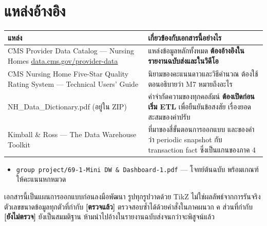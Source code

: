 \documentclass[11pt,a4paper]{article}
\newcommand{\sansall}{\sffamily}
\newcommand{\code}[1]{\texttt{#1}}
\newcommand{\ok}{\textcolor{dw}{\textbf{[ตรวจแล้ว]}}}
\newcommand{\tbc}{\textcolor{etl}{\textbf{[ยังไม่ตรวจ]}}}
\begin{document}
\section{แหล่งอ้างอิง}

\begin{table}[H]\centering\small
\begin{tabular}{L{5.4cm} L{10.0cm}}
\toprule
\sansall\bfseries แหล่ง & \sansall\bfseries เกี่ยวข้องกับเอกสารนี้อย่างไร \\
\midrule
CMS Provider Data Catalog --- Nursing Homes \newline
\url{data.cms.gov/provider-data} &
  แหล่งข้อมูลหลักทั้งหมด \textbf{ต้องอ้างอิงในรายงานฉบับส่งและในวิดีโอ} \\
\addlinespace
CMS Nursing Home Five-Star Quality Rating System --- Technical Users' Guide &
  นิยามของคะแนนดาวและวิธีคำนวณ ต้องใช้ตอนอธิบายว่า M7 หมายถึงอะไร \\
\addlinespace
NH\_Data\_Dictionary.pdf (อยู่ใน ZIP) &
  คำจำกัดความของทุกคอลัมน์ \textbf{ต้องเปิดก่อนเริ่ม ETL} เพื่อยืนยันข้อสงสัย
  เรื่องยอดสะสมของค่าปรับ \\
\addlinespace
Kimball \& Ross --- The Data Warehouse Toolkit &
  ที่มาของสี่ขั้นตอนการออกแบบ และของคำว่า periodic snapshot กับ transaction fact
  ซึ่งเป็นแกนของภาค 4 \\
\bottomrule
\end{tabular}
\end{table}

\begin{keybox}[title={เอกสารภายในโครงงานที่ควรอ่านคู่กัน}]
\begin{itemize}
\item \code{group project/69-1-Mini DW \& Dashboard-1.pdf} --- โจทย์ต้นฉบับ
      พร้อมเกณฑ์ให้คะแนนหกหมวด
\end{itemize}
\end{keybox}

\vfill
\begin{center}
\end{center}
{\sansall\footnotesize\color{muted}
เอกสารนี้เป็นแผนการออกแบบก่อนลงมือพัฒนา รูปทุกรูปวาดด้วย TikZ ไม่ใช่ผลลัพธ์จากการรันจริง
ตัวเลขขนาดข้อมูลทุกตัวที่กำกับ \ok{} ตรวจสอบซ้ำได้ด้วยคำสั่งในภาคผนวก ค
ส่วนที่กำกับ \tbc{} ยังเป็นสมมติฐาน ห้ามนำไปอ้างในรายงานฉบับส่งจนกว่าจะพิสูจน์แล้ว\par}
\end{document}

